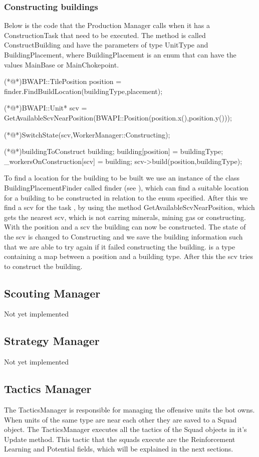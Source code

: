 		\subsubsection*{Constructing buildings}
			Below is the code that the Production Manager calls when it has a ConstructionTask that need to be executed. The method is called 
			ConstructBuilding and have the parameters of type UnitType and BuildingPlacement, where BuildingPlacement 
			is an enum that can have the values MainBase or MainChokepoint.
			\begin{Sourcecode}[caption=ConstructBuilding method]		
	(*@\lnote@*)BWAPI::TilePosition position = finder.FindBuildLocation(buildingType,placement);

	(*@\lnote@*)BWAPI::Unit* scv = GetAvailableScvNearPosition(BWAPI::Position(position.x(),position.y()));
	

	(*@\lnote@*)SwitchState(scv,WorkerManager::Constructing);
	
	(*@\lnote@*)buildingToConstruct building;	
	building[position] = buildingType;
	_workersOnConstruction[scv] = building;
	scv->build(position,buildingType);
			\end{Sourcecode}
			
			To find a location for the building to be built we use an instance of the class BuildingPlacementFinder called finder (see ), 
			which can find a suitable location for a building to be constructed in relation to the enum specified. After this we find a scv for the 
			task , by using the method GetAvailableScvNearPosition, which gets the nearest scv, which is not carring minerals, mining gas or 
			constructing. With the position and a scv the building can now be constructed. The state of the scv is changed to Constructing  and 
			we save the building information such that we are able to try again if it failed constructing the building.  is a type containing 
			a map between a position and a building type. After this the scv tries to 
			construct the building.
	\subsection{Scouting Manager}
		Not yet implemented
	\subsection{Strategy Manager}
		Not yet implemented
	\subsection{Tactics Manager}
		The TacticsManager is responsible for managing the offensive units the bot owns. When units of the same type are near each other they are saved 
		to a Squad object. The TacticsManager executes all the tactics of the Squad objects in it's Update method. This tactic that the squads execute 
		are the Reinforcement Learning and Potential fields, which will be explained in the next sections.
		
			
		
			
			
				
			
		
